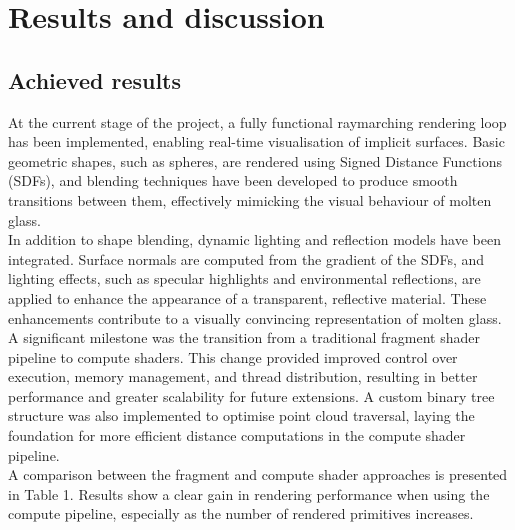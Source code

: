 \documentclass{rapportcs}
\begin{document}
\section{Results and discussion}
    \subsection{Achieved results}
    
        At the current stage of the project, a fully functional raymarching rendering loop has been implemented, enabling real-time visualisation of implicit surfaces. Basic geometric shapes, such as spheres, are rendered using Signed Distance Functions (SDFs), and blending techniques have been developed to produce smooth transitions between them, effectively mimicking the visual behaviour of molten glass.\\
    
        \noindent In addition to shape blending, dynamic lighting and reflection models have been integrated. Surface normals are computed from the gradient of the SDFs, and lighting effects, such as specular highlights and environmental reflections, are applied to enhance the appearance of a transparent, reflective material. These enhancements contribute to a visually convincing representation of molten glass.\\
        
        \noindent A significant milestone was the transition from a traditional fragment shader pipeline to compute shaders. This change provided improved control over execution, memory management, and thread distribution, resulting in better performance and greater scalability for future extensions. A custom binary tree structure was also implemented to optimise point cloud traversal, laying the foundation for more efficient distance computations in the compute shader pipeline.\\
    
        \noindent A comparison between the fragment and compute shader approaches is presented in Table 1. Results show a clear gain in rendering performance when using the compute pipeline, especially as the number of rendered primitives increases.
    
\end{document}
